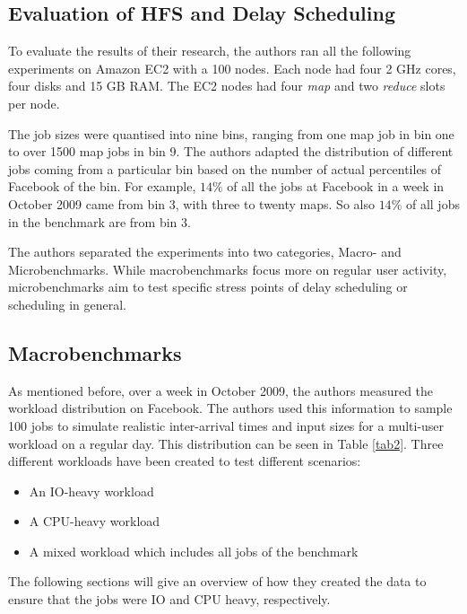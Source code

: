\subsection{Evaluation of HFS and Delay Scheduling}

To evaluate the results of their research, the authors ran all the following experiments on Amazon EC2 with a 100 nodes. Each node had four 2 GHz cores, four disks and 15 GB RAM. The EC2 nodes had four \textit{map} and two \textit{reduce} slots per node. 

The job sizes were quantised into nine bins, ranging from one map job in bin one to over 1500 map jobs in bin 9. The authors adapted the distribution of different jobs coming from a particular bin based on the number of actual percentiles of Facebook of the bin. For example, $14\%$ of all the jobs at Facebook in a week in October 2009 came from bin 3, with three to twenty maps. So also $14\%$ of all jobs in the benchmark are from bin 3.

The authors separated the experiments into two categories, Macro- and Microbenchmarks. While macrobenchmarks focus more on regular user activity, microbenchmarks aim to test specific stress points of delay scheduling or scheduling in general.

\subsection{Macrobenchmarks}

As mentioned before, over a week in October 2009, the authors measured the workload distribution on Facebook. The authors used this information to sample 100 jobs to simulate realistic inter-arrival times and input sizes for a multi-user workload on a regular day. This distribution can be seen in Table \ref{tab2}. Three different workloads have been created to test different scenarios:

\begin{itemize}
    \item An IO-heavy workload
    \item A CPU-heavy workload
    \item A mixed workload which includes all jobs of the benchmark
\end{itemize}

The following sections will give an overview of how they created the data to ensure that the jobs were IO and CPU heavy, respectively.


